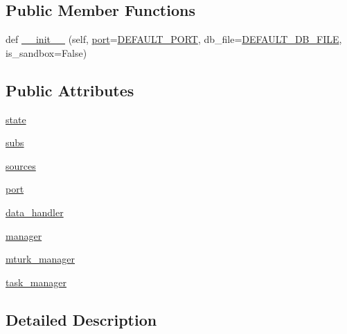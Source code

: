 \subsection*{Public Member Functions}
\begin{DoxyCompactItemize}
\item 
def \hyperlink{classparlai_1_1mturk_1_1webapp_1_1server_1_1Application_a0c8d2d2d9418e9654a734ccef5a09942}{\+\_\+\+\_\+init\+\_\+\+\_\+} (self, \hyperlink{classparlai_1_1mturk_1_1webapp_1_1server_1_1Application_a206b0e1b1cea8274f21a0ce980d76dfb}{port}=\hyperlink{namespaceparlai_1_1mturk_1_1webapp_1_1server_ab2dbe49416f69522010b6c9a211af0e3}{D\+E\+F\+A\+U\+L\+T\+\_\+\+P\+O\+RT}, db\+\_\+file=\hyperlink{namespaceparlai_1_1mturk_1_1webapp_1_1server_a7d1b65251987c39df64aeb32f36f6a9f}{D\+E\+F\+A\+U\+L\+T\+\_\+\+D\+B\+\_\+\+F\+I\+LE}, is\+\_\+sandbox=False)
\end{DoxyCompactItemize}
\subsection*{Public Attributes}
\begin{DoxyCompactItemize}
\item 
\hyperlink{classparlai_1_1mturk_1_1webapp_1_1server_1_1Application_a9280c9b9e3b934c9da7381a2bc04c867}{state}
\item 
\hyperlink{classparlai_1_1mturk_1_1webapp_1_1server_1_1Application_a093ceb0dda80a2cf6695111161e112b2}{subs}
\item 
\hyperlink{classparlai_1_1mturk_1_1webapp_1_1server_1_1Application_afb5154a1ef04c2c2efd4e9b710b9b848}{sources}
\item 
\hyperlink{classparlai_1_1mturk_1_1webapp_1_1server_1_1Application_a206b0e1b1cea8274f21a0ce980d76dfb}{port}
\item 
\hyperlink{classparlai_1_1mturk_1_1webapp_1_1server_1_1Application_a73c29eb37d95de2143d81d7cdb775417}{data\+\_\+handler}
\item 
\hyperlink{classparlai_1_1mturk_1_1webapp_1_1server_1_1Application_ae55f819d9aa679ede302ea8931b35642}{manager}
\item 
\hyperlink{classparlai_1_1mturk_1_1webapp_1_1server_1_1Application_afef729389279805c83048d79d5de7d9f}{mturk\+\_\+manager}
\item 
\hyperlink{classparlai_1_1mturk_1_1webapp_1_1server_1_1Application_a7ad5b113a0889b6dfef99e168cb0b69f}{task\+\_\+manager}
\end{DoxyCompactItemize}


\subsection{Detailed Description}


